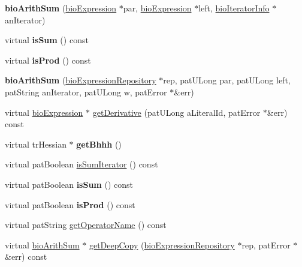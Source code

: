 \begin{DoxyCompactItemize}
\item 
\mbox{\label{classbio_arith_sum_a6afd62a5e7a17d2f4b8268b07aee7ba8}} 
{\bfseries bio\+Arith\+Sum} (\hyperlink{classbio_expression}{bio\+Expression} $\ast$par, \hyperlink{classbio_expression}{bio\+Expression} $\ast$left, \hyperlink{classbio_iterator_info}{bio\+Iterator\+Info} $\ast$an\+Iterator)
\item 
\mbox{\label{classbio_arith_sum_a58684f56172a3200a4caaeaad00b070d}} 
virtual {\bfseries is\+Sum} () const
\item 
\mbox{\label{classbio_arith_sum_a9e85e0def0ec3e7eeba4a93ef508337e}} 
virtual {\bfseries is\+Prod} () const
\item 
\mbox{\label{classbio_arith_sum_af5f0818c44873b2cb1c10769468dca23}} 
{\bfseries bio\+Arith\+Sum} (\hyperlink{classbio_expression_repository}{bio\+Expression\+Repository} $\ast$rep, pat\+U\+Long par, pat\+U\+Long left, pat\+String an\+Iterator, pat\+U\+Long w, pat\+Error $\ast$\&err)
\item 
virtual \hyperlink{classbio_expression}{bio\+Expression} $\ast$ \hyperlink{classbio_arith_sum_a2c030d0fea64581fe6f33031d3d3c977}{get\+Derivative} (pat\+U\+Long a\+Literal\+Id, pat\+Error $\ast$\&err) const
\item 
\mbox{\label{classbio_arith_sum_ae22ebe2bc507588c53bdac6144381adf}} 
virtual tr\+Hessian $\ast$ {\bfseries get\+Bhhh} ()
\item 
virtual pat\+Boolean \hyperlink{classbio_arith_sum_ab0747dc4d0f4fbe2cb246b265ec3cd11}{is\+Sum\+Iterator} () const
\item 
\mbox{\label{classbio_arith_sum_ac2adee4ec319273e2e571a5dc3fd5fdf}} 
virtual pat\+Boolean {\bfseries is\+Sum} () const
\item 
\mbox{\label{classbio_arith_sum_a44affda18b23bdbfae680143df4293cb}} 
virtual pat\+Boolean {\bfseries is\+Prod} () const
\item 
virtual pat\+String \hyperlink{classbio_arith_sum_a9e0ab0b9062a7cd80e70fc16505bc282}{get\+Operator\+Name} () const
\item 
virtual \hyperlink{classbio_arith_sum}{bio\+Arith\+Sum} $\ast$ \hyperlink{classbio_arith_sum_ab3264f5810c52c59b96ae72370e441ff}{get\+Deep\+Copy} (\hyperlink{classbio_expression_repository}{bio\+Expression\+Repository} $\ast$rep, pat\+Error $\ast$\&err) const

\end{DoxyCompactItemize}
